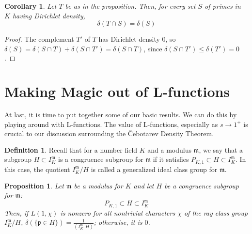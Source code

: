 \documentclass{article}
\theoremstyle{plain}
\newtheorem{cor}[thm]{Corollary}
\newtheorem{prop}[thm]{Proposition}
\theoremstyle{definition}
\newtheorem{defn}[thm]{Definition}
\theoremstyle{remark}
\numberwithin{equation}{section}
\numberwithin{thm}{section}
\begin{document}
\begin{cor} \label{5.7}
Let $T$ be as in the proposition. Then, for every set $S$ of primes in $K$ having Dirichlet density, $$\delta(T \cap S) = \delta(S)$$
\end{cor}

\begin{proof}
The complement $T'$ of $T$ has Dirichlet density $0$, so $\delta(S) = \delta(S \cap T) + \delta(S \cap T') = \delta(S \cap T)$, since $\delta(S \cap T') \leq \delta(T') = 0$. 
\end{proof}

\section{Making Magic out of L-functions}

At last, it is time to put together some of our basic results. We can do this by playing around with L-functions. The value of L-functions, especially as $s \to 1^{+}$ is crucial to our discussion surrounding the Čebotarev Density Theorem. 

\begin{defn}
Recall that for a number field $K$ and a modulus $\mathfrak{m}$, we say that a subgroup $H \subset I_{K}^{\mathfrak{m}}$ is a congruence subgroup for $\mathfrak{m}$ if it satisfies $P_{K, 1} \subset H \subset I_{K}^{\mathfrak{m}}$. In this case, the quotient $I_{K}^{\mathfrak{m}}/H$ is called a generalized ideal class group for $\mathfrak{m}$.  
\end{defn}

\begin{prop} \label{6.2}
Let $\mathfrak{m}$ be a modulus for $K$ and let $H$ be a congruence subgroup for $\mathfrak{m}$: $$P_{K, 1} \subset H \subset I_{K}^{\mathfrak{m}}$$ Then, if $L(1, \chi)$ is nonzero for all nontrivial characters $\chi$ of the ray class group $I_{K}^{\mathfrak{m}}/H$, $\delta(\{\mathfrak{p} \in H\}) = \frac{1}{(I_{K}^{\mathfrak{m}} : H)}$; otherwise, it is $0$. 
\end{prop}
\end{document}
